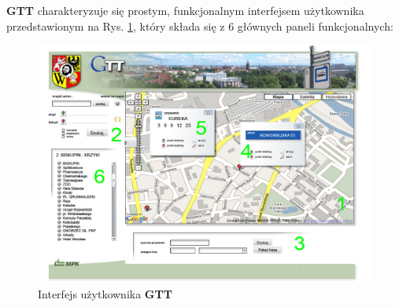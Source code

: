\documentclass[a4paper,12pt]{article}
\begin{document}
 \textbf{GTT} charakteryzuje się prostym, funkcjonalnym interfejsem
 użytkownika przedstawionym na Rys. \ref{interfejs_help}, który składa się z 6
 głównych paneli funkcjonalnych:
  \begin{figure}[htp]
\centering
\includegraphics[width=\textwidth]{interfejs_help} 
\caption{Interfejs użytkownika \textbf{GTT}}\label{interfejs_help}
\end{figure}
\end{document}
